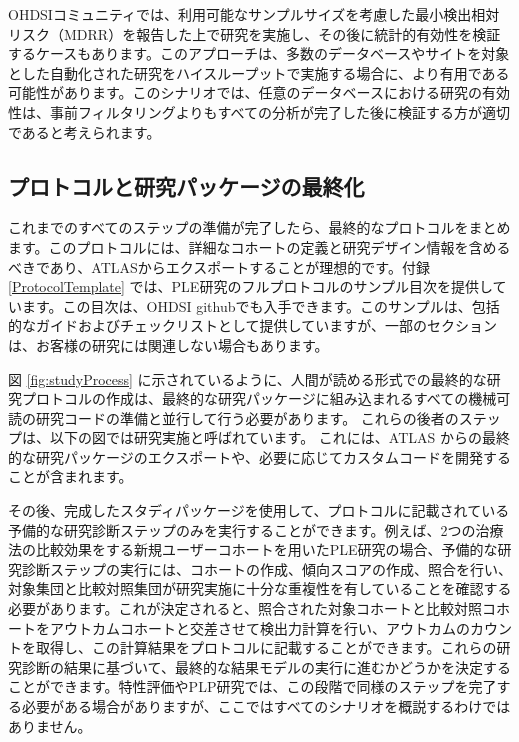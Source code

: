 \documentclass[
  11pt]{book}
\theoremstyle{definition}
\theoremstyle{definition}
\theoremstyle{definition}
\theoremstyle{definition}
\theoremstyle{remark}
\begin{document}
OHDSIコミュニティでは、利用可能なサンプルサイズを考慮した最小検出相対リスク（MDRR）を報告した上で研究を実施し、その後に統計的有効性を検証するケースもあります。このアプローチは、多数のデータベースやサイトを対象とした自動化された研究をハイスループットで実施する場合に、より有用である可能性があります。このシナリオでは、任意のデータベースにおける研究の有効性は、事前フィルタリングよりもすべての分析が完了した後に検証する方が適切であると考えられます。

\subsection{プロトコルと研究パッケージの最終化}\label{ux30d7ux30edux30c8ux30b3ux30ebux3068ux7814ux7a76ux30d1ux30c3ux30b1ux30fcux30b8ux306eux6700ux7d42ux5316}

これまでのすべてのステップの準備が完了したら、最終的なプロトコルをまとめます。このプロトコルには、詳細なコホートの定義と研究デザイン情報を含めるべきであり、ATLASからエクスポートすることが理想的です。付録 \ref{ProtocolTemplate} では、PLE研究のフルプロトコルのサンプル目次を提供しています。この目次は、OHDSI githubでも入手できます。このサンプルは、包括的なガイドおよびチェックリストとして提供していますが、一部のセクションは、お客様の研究には関連しない場合もあります。

図 \ref{fig:studyProcess} に示されているように、人間が読める形式での最終的な研究プロトコルの作成は、最終的な研究パッケージに組み込まれるすべての機械可読の研究コードの準備と並行して行う必要があります。 これらの後者のステップは、以下の図では研究実施と呼ばれています。 これには、ATLAS からの最終的な研究パッケージのエクスポートや、必要に応じてカスタムコードを開発することが含まれます。

その後、完成したスタディパッケージを使用して、プロトコルに記載されている予備的な研究診断ステップのみを実行することができます。例えば、2つの治療法の比較効果をする新規ユーザーコホートを用いたPLE研究の場合、予備的な研究診断ステップの実行には、コホートの作成、傾向スコアの作成、照合を行い、対象集団と比較対照集団が研究実施に十分な重複性を有していることを確認する必要があります。これが決定されると、照合された対象コホートと比較対照コホートをアウトカムコホートと交差させて検出力計算を行い、アウトカムのカウントを取得し、この計算結果をプロトコルに記載することができます。これらの研究診断の結果に基づいて、最終的な結果モデルの実行に進むかどうかを決定することができます。特性評価やPLP研究では、この段階で同様のステップを完了する必要がある場合がありますが、ここではすべてのシナリオを概説するわけではありません。
\end{document}
